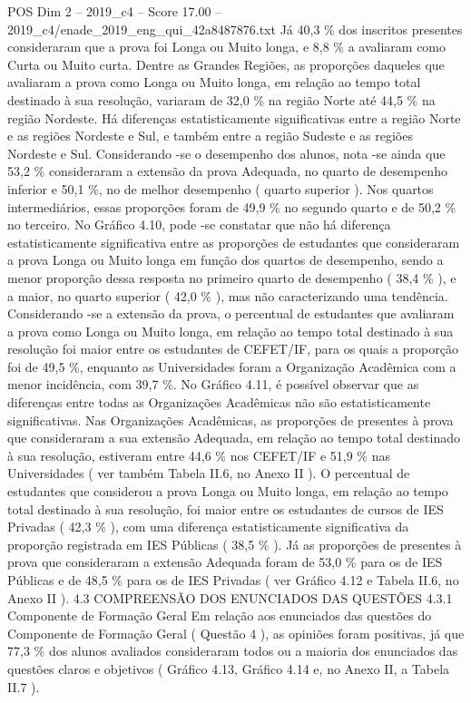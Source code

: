 \begin{textsample}{POS Dim 2 – 2019\_c4 – Score 17.00 – 2019\_c4/enade\_2019\_eng\_qui\_42a8487876.txt}
Já 40,3 \% dos inscritos presentes consideraram que a prova foi Longa ou Muito longa, e 8,8 \% a avaliaram como Curta ou Muito curta.
Dentre as Grandes Regiões, as proporções daqueles que avaliaram a prova como Longa ou Muito longa, em relação ao tempo total destinado à sua resolução, variaram de 32,0 \% na região Norte até 44,5 \% na região Nordeste.
Há diferenças estatisticamente significativas entre a região Norte e as regiões Nordeste e Sul, e também entre a região Sudeste e as regiões Nordeste e Sul.
Considerando -se o desempenho dos alunos, nota -se ainda que 53,2 \% consideraram a extensão da prova Adequada, no quarto de desempenho inferior e 50,1 \%, no de melhor desempenho ( quarto superior ).
Nos quartos intermediários, essas proporções foram de 49,9 \% no segundo quarto e de 50,2 \% no terceiro.
No Gráfico 4.10, pode -se constatar que não há diferença estatisticamente significativa entre as proporções de estudantes que consideraram a prova Longa ou Muito longa em função dos quartos de desempenho, sendo a menor proporção dessa resposta no primeiro quarto de desempenho ( 38,4 \% ), e a maior, no quarto superior ( 42,0 \% ), mas não caracterizando uma tendência.
Considerando -se a extensão da prova, o percentual de estudantes que avaliaram a prova como Longa ou Muito longa, em relação ao tempo total destinado à sua resolução foi maior entre os estudantes de CEFET/IF, para os quais a proporção foi de 49,5 \%, enquanto as Universidades foram a Organização Acadêmica com a menor incidência, com 39,7 \%.
No Gráfico 4.11, é possível observar que as diferenças entre todas as Organizações Acadêmicas não são estatisticamente significativas.
Nas Organizações Acadêmicas, as proporções de presentes à prova que consideraram a sua extensão Adequada, em relação ao tempo total destinado à sua resolução, estiveram entre 44,6 \% nos CEFET/IF e 51,9 \% nas Universidades ( ver também Tabela II.6, no Anexo II ).
O percentual de estudantes que considerou a prova Longa ou Muito longa, em relação ao tempo total destinado à sua resolução, foi maior entre os estudantes de cursos de IES Privadas ( 42,3 \% ), com uma diferença estatisticamente significativa da proporção registrada em IES Públicas ( 38,5 \% ).
Já as proporções de presentes à prova que consideraram a extensão Adequada foram de 53,0 \% para os de IES Públicas e de 48,5 \% para os de IES Privadas ( ver Gráfico 4.12 e Tabela II.6, no Anexo II ). 4.3 COMPREENSÃO DOS ENUNCIADOS DAS QUESTÕES 4.3.1 Componente de Formação Geral Em relação aos enunciados das questões do Componente de Formação Geral ( Questão 4 ), as opiniões foram positivas, já que 77,3 \% dos alunos avaliados consideraram todos ou a maioria dos enunciados das questões claros e objetivos ( Gráfico 4.13, Gráfico 4.14 e, no Anexo II, a Tabela II.7 ).

\end{textsample}
